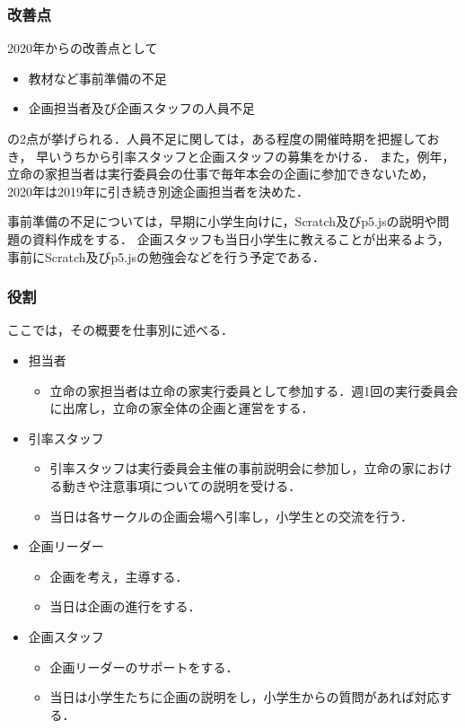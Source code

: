 \subsubsection*{改善点}
2020年からの改善点として
\begin {itemize}
    \item 教材など事前準備の不足
    \item 企画担当者及び企画スタッフの人員不足
\end {itemize}
の2点が挙げられる．人員不足に関しては，ある程度の開催時期を把握しておき，
早いうちから引率スタッフと企画スタッフの募集をかける．
また，例年，立命の家担当者は実行委員会の仕事で毎年本会の企画に参加できないため，
2020年は2019年に引き続き別途企画担当者を決めた．

事前準備の不足については，早期に小学生向けに，Scratch及びp5.jsの説明や問題の資料作成をする．
企画スタッフも当日小学生に教えることが出来るよう，事前にScratch及びp5.jsの勉強会などを行う予定である．
\subsubsection*{役割}
ここでは，その概要を仕事別に述べる．
\begin{itemize}
 \item 担当者
  \begin{itemize}
  \item 立命の家担当者は立命の家実行委員として参加する．週1回の実行委員会に出席し，立命の家全体の企画と運営をする．
  \end{itemize}
 \item 引率スタッフ
　\begin{itemize}
  \item 引率スタッフは実行委員会主催の事前説明会に参加し，立命の家における動きや注意事項についての説明を受ける．
  \item 当日は各サークルの企画会場へ引率し，小学生との交流を行う．
  \end{itemize}
 \item 企画リーダー
  \begin{itemize}
  \item 企画を考え，主導する．
  \item 当日は企画の進行をする．
  \end{itemize}
 \item 企画スタッフ
  \begin{itemize}
  \item 企画リーダーのサポートをする．
  \item 当日は小学生たちに企画の説明をし，小学生からの質問があれば対応する．
  \end{itemize}
\end{itemize}
